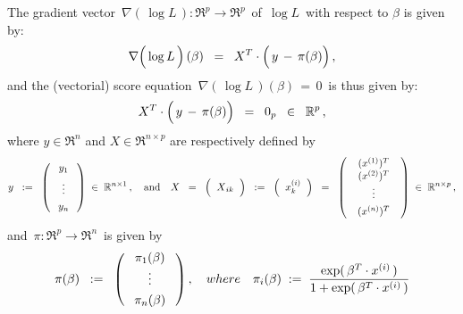 \begin{proposition}
\begin{enumerate}
	The gradient vector
	\,$\nabla\!\left(\,\log L\,\right) : \Re^{p} \longrightarrow \Re^{p}$\,
	of
	\,$\log L$\,
	with respect to $\beta$ is given by:
	\begin{equation*}
	\nabla\!\left(\,\overset{{\color{white}.}}{\log}\,L\,\right)(\beta)
	\;\; = \;\;
		X^{T} \cdot \left(\, y \,\overset{{\color{white}.}}{-}\, \pi(\beta) \right),
	\end{equation*}
	and the (vectorial) score equation
	\,$\nabla\!\left(\,\log L\,\right)(\beta) \,=\, 0$\,
	is thus given by:
	\begin{equation*}
		X^{T} \cdot \left(\, y \,\overset{{\color{white}.}}{-}\, \pi(\beta) \right)
	\;\; = \;\;
		0_{p} \;\; \in \;\; \Re^{p}\,,
	\end{equation*}
	where $y \in \Re^{n}$ and $X \in \Re^{n \times p}$ are respectively defined by
	\begin{equation*}
	y
	\;\; := \;\;
		\left(\;\begin{array}{c}
		y_{1} \\
		\underset{{\color{white}.}}{\overset{{\color{white}.}}{\vdots}} \\
		y_{n}
		\end{array}\;\right)
	\;\in\;
		\Re^{n \times 1}\,, 
	\quad\textnormal{and}\quad
	X
	\;\;=\;\;
		\left(\;\;\overset{{\color{white}.}}{X}_{ik}\;\;\right)
	\;\;:=\;\;
		\left(\;\; x^{(i)}_{k} \;\;\right)
	\;\;=\;\;
		\left(\;\;
			\begin{array}{c} (x^{(1)})^{T} \\ (x^{(2)})^{T} \\ \underset{{\color{white}1}}{\vdots} \\ (x^{(n)})^{T} \end{array}
			\;\;\right)
	\; \in \; \Re^{n \times p}\,,
	\end{equation*}
	and \,$\pi : \Re^{p} \longrightarrow \Re^{n}$\, is given by
	\begin{equation*}
	\pi(\beta) \;\;:=\;\; \left(\;
		\begin{array}{c} \pi_{1}(\beta) \\ \underset{{\color{white}^{.}}}{\vdots} \\ \pi_{n}(\beta) \end{array}
		\;\right),
	\quad{where}\quad
	\pi_{i}(\beta)
	\; := \;
		\dfrac{\exp(\,\beta^{T} \cdot x^{(i)}\,)}{1 + \exp(\,\beta^{T} \cdot x^{(i)}\,)}

\end{equation*}
\end{enumerate}
\end{proposition}
